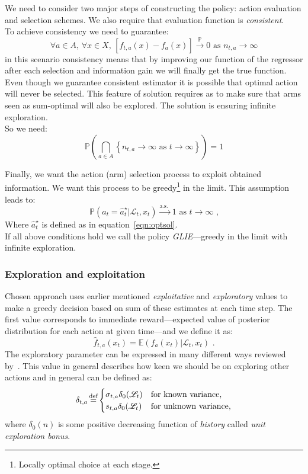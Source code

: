 \documentclass[12pt, a4paper, pdflatex, leqno]{report}
\newcommand{\myeq}{\stackrel{\mathclap{\normalfont\scriptsize\mbox{def}}}{=}}
\begin{document}
We need to consider two major steps of constructing the policy: action evaluation and selection schemes. We also require that evaluation function is \emph{consistent}.\\

To achieve consistency we need to guarantee:
$$
  \forall a \in A \text{, } \forall x \in X \text{, } \left[ \hat{f}_{t, a}(x) - f_a(x) \right] \xrightarrow{\mathbb{P}} 0 \text{ as } n_{t,a} \rightarrow \infty
$$
in this scenario consistency means that by improving our function of the regressor after each selection and information gain we will finally get the true function.\\

Even though we guarantee consistent estimator it is possible that optimal action will never be selected. This feature of solution requires as to make sure that arms seen as sum-optimal will also be explored. The solution is ensuring infinite exploration.\\

So we need:
$$
  \mathbb{P} \left( \bigcap_{a \in A} \left\{ n_{t,a} \rightarrow \infty \text{ as } t \rightarrow \infty \right\} \right) = 1
$$

Finally, we want the action (arm) selection process to exploit obtained information. We want this process to be greedy\footnote{Locally optimal choice at each stage.} in the limit. This assumption leads to:\\
$$
  \mathbb{P} \left( a_t = \hat{a}_t^\star | \mathscr{L}_t, x_t \right) \xrightarrow{\text{a.s.\ }} 1 \text{ as } t \rightarrow \infty \text{ ,}
$$
Where $\hat{a}_t^\star$ is defined as in equation~\ref{eqn:optsol}.\\

If all above conditions hold we call the policy \emph{GLIE}---greedy in the limit with infinite exploration.\\


\subsubsection{Exploration and exploitation}
Chosen approach uses earlier mentioned \emph{exploitative} and \emph{exploratory} values to make a greedy decision based on sum of these estimates at each time step. The first value corresponds to immediate reward---expected value of posterior distribution for each action at given time---and we define it as:
$$
  \hat{f}_{t,a} (x_t) = \mathbb{E} ( f_a(x_t) | \mathscr{L}_t, x_t ) \text{ .}
$$
The exploratory parameter can be expressed in many different ways reviewed by~\citep{meuleau:exploration}. This value in general describes how keen we should be on exploring other actions and in general can be defined as:
$$
  \delta_{t,a} \myeq
    \begin{cases}
     \sigma_{t,a} \delta_0(\mathscr{L}_t) & \text{for known variance,}\\
     s_{t,a}      \delta_0(\mathscr{L}_t) & \text{for unknown variance,}
    \end{cases}
$$
where $\delta_0(n)$ is some positive decreasing function of \emph{history} called \emph{unit exploration bonus}.\\
\end{document}
